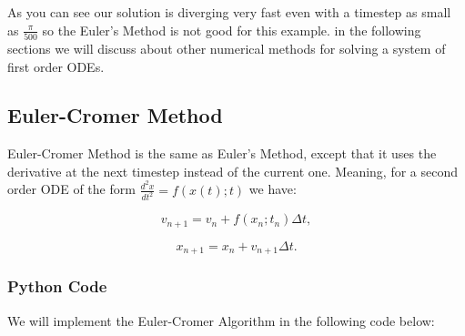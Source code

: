 \documentclass[11pt]{article}
\begin{document}
    As you can see our solution is diverging very fast even with a timestep
as small as \(\frac{\pi}{500}\) so the Euler's Method is not good for
this example. in the following sections we will discuss about other
numerical methods for solving a system of first order ODEs.

    \hypertarget{euler-cromer-method}{%
\subsection{Euler-Cromer Method}\label{euler-cromer-method}}

Euler-Cromer Method is the same as Euler's Method, except that it uses
the derivative at the next timestep instead of the current one. Meaning,
for a second order ODE of the form \(\frac{d^2 x}{{dt}^2} = f(x(t);t)\)
we have:

\begin{equation}
    v_{n+1} = v_n + f(x_n;t_n)\Delta t,
\end{equation}

\begin{equation}\label{eq:Euler_Cromer_Algorithm}
    x_{n+1} = x_n + v_{n+1}\Delta t. 
\end{equation}

\hypertarget{python-code}{%
\subsubsection{Python Code}\label{python-code-2}}

We will implement the Euler-Cromer Algorithm in the following code
below:
\end{document}

